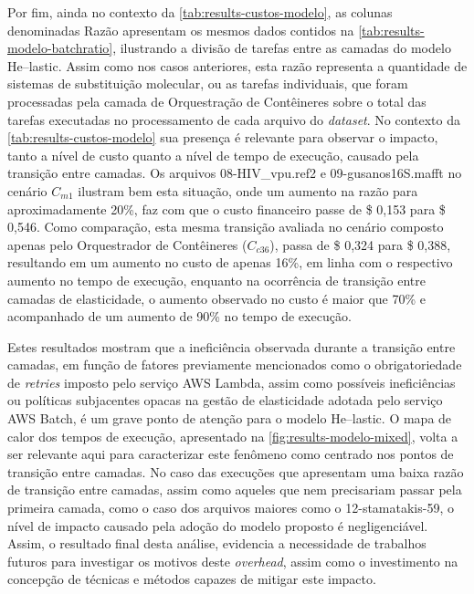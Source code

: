 \documentclass[english,brazilian]{UNISINOSmonografia} %
\begin{document}
Por fim, ainda no contexto da \autoref{tab:results-custos-modelo}, as colunas denominadas Razão apresentam os mesmos dados contidos na \autoref{tab:results-modelo-batchratio}, ilustrando a divisão de tarefas entre as camadas do modelo \textsf{He}--lastic.
%
Assim como nos casos anteriores, esta razão representa a quantidade de sistemas de substituição molecular, ou as tarefas individuais, que foram processadas pela camada de Orquestração de Contêineres sobre o total das tarefas executadas no processamento de cada arquivo do \textit{dataset}.
%
No contexto da \autoref{tab:results-custos-modelo} sua presença é relevante para observar o impacto, tanto a nível de custo quanto a nível de tempo de execução, causado pela transição entre camadas.
%
Os arquivos 08-HIV\_vpu.ref2 e 09-gusanos16S.mafft no cenário $C_{m1}$ ilustram bem esta situação, onde um aumento na razão para aproximadamente 20\%, faz com que o custo financeiro passe de \$ 0,153 para \$ 0,546.
%
Como comparação, esta mesma transição avaliada no cenário composto apenas pelo Orquestrador de Contêineres ($C_{c36}$), passa de \$ 0,324 para \$ 0,388, resultando em um aumento no custo de apenas 16\%, em linha com o respectivo aumento no tempo de execução, enquanto na ocorrência de transição entre camadas de elasticidade, o aumento observado no custo é maior que 70\% e acompanhado de um aumento de 90\% no tempo de execução.



Estes resultados mostram que a ineficiência observada durante a transição entre camadas, em função de fatores previamente mencionados como o obrigatoriedade de \textit{retries} imposto pelo serviço AWS Lambda, assim como possíveis ineficiências ou políticas subjacentes opacas na gestão de elasticidade adotada pelo serviço AWS Batch, é um grave ponto de atenção para o modelo \textsf{He}--lastic.
%
O mapa de calor dos tempos de execução, apresentado na \autoref{fig:results-modelo-mixed}, volta a ser relevante aqui para caracterizar este fenômeno como centrado nos pontos de transição entre camadas.
%
No caso das execuções que apresentam uma baixa razão de transição entre camadas, assim como aqueles que nem precisariam passar pela primeira camada, como o caso dos arquivos maiores como o 12-stamatakis-59, o nível de impacto causado pela adoção do modelo proposto é negligenciável.
%
Assim, o resultado final desta análise, evidencia a necessidade de trabalhos futuros para investigar os motivos deste \textit{overhead}, assim como o investimento na concepção de técnicas e métodos capazes de mitigar este impacto.
\end{document}
